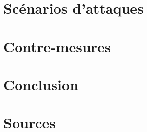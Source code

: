 \documentclass[12pt]{article}
\begin{document}
\section{Scénarios d'attaques}
\label{sec:scenarios}

\section{Contre-mesures}

\section{Conclusion}
\label{sec:conclusion}

\section{Sources}
\label{sec:sources}
\end{document}
